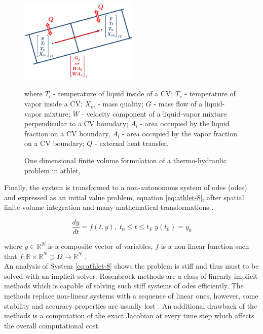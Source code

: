 \figpointer{\ref{fig:introduction-1d-fvm}}
\begin{figure}[htpb]
  \centering
  \includegraphics[width=0.5\textwidth]{figures/introduction-1d-fvm.png}
\caption{One dimensional finite volume formulation of a thermo-hydraulic problem in \acrshort{athlet}, \cite{tims-presentation}}
\vspace{3mm}
where $T_l$ - temperature of liquid inside of a CV; $T_v$ - temperature of vapor inside a CV; $X_m$ - mass quality; $G$ - mass flow of a liquid-vapor mixture; $W$ - velocity component of a liquid-vapor mixture perpendicular to a CV boundary; $A_l$ - area occupied by the liquid fraction on a CV boundary, $A_l$ - area occupied by the vapor fraction on a CV boundary; $Q$ - external heat transfer.
\label{fig:introduction-1d-fvm}
\end{figure}


Finally, the system is transformed to a non-autonomous system of \acrlong{ode}s (\acrshort{ode}s) and expressed as an initial value problem, equation \ref{eq:athlet-8}, after spatial finite volume integration and many mathematical transformations \cite{lt:ATHLMaM}. 


\begin{equation} \label{eq:athlet-8}
	\frac{dy}{dt} = f(t,y), \;  t_{0} \leq t \leq t_{F} \; y(t_{0}) = y_{0}
\end{equation}

where $y \in \mathbb{R}^{N}$ is a composite vector of variables, $f$ is a non-linear function such that $f : \mathbb{R} \times \mathbb{R}^{N} \supset \Omega  \rightarrow \mathbb{R}^{N}$  .\\


An analysis of System \ref{eq:athlet-8} shows the problem is stiff and thus must to be solved with an implicit solver. Rosenbrock methods are a class of linearly implicit methods which is capable of solving such stiff systems of \acrshort{ode}s efficiently. The methods replace non-linear systems with a sequence of linear ones, however, some stability and accuracy properties are usually lost \cite{blom2013rosenbrock}. An additional drawback of the methods is a computation of the exact Jacobian at every time step which affects the overall computational cost.\\


